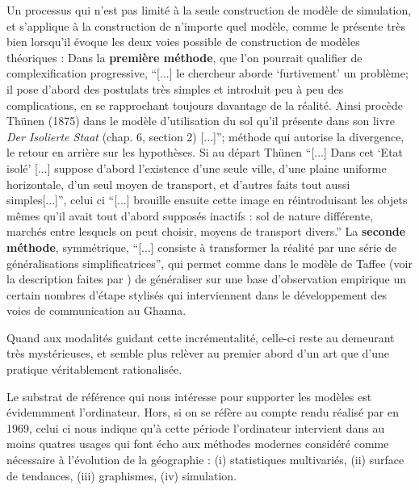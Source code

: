 Un processus qui n'est pas limité à la seule construction de modèle de simulation, et s'applique à la construction de n'importe quel modèle, comme le présente très bien \textcite[32-33]{Haggett1965} lorsqu'il évoque les deux voies possible de construction de modèles théoriques : Dans la \textbf{première méthode}, que l'on pourrait qualifier de complexification progressive, \enquote{[...] le chercheur aborde \enquote{furtivement} un problème; il pose d'abord des postulats très simples et introduit peu à peu des complications, en se rapprochant toujours davantage de la réalité. Ainsi procède Thünen (1875) dans le modèle d'utilisation du sol qu'il présente dans son livre \textit{Der Isolierte Staat} (chap. 6, section 2) [...]}; méthode qui autorise la divergence, le retour en arrière sur les hypothèses. Si au départ Thünen \enquote{[...] Dans cet \enquote{Etat isolé} [...] suppose d'abord l'existence d'une seule ville, d'une plaine uniforme horizontale, d'un seul moyen de transport, et d'autres faits tout aussi simples[...]}, celui ci \enquote{[...] brouille ensuite cette image en réintroduisant les objets mêmes qu'il avait tout d'abord supposés inactifs : sol de nature différente, marchés entre lesquels on peut choisir, moyens de transport divers.} La \textbf{seconde méthode}, symmétrique, \enquote{[...] consiste à transformer la réalité par une série de généralisations simplificatrices}, qui permet comme dans le modèle de Taffee (voir la description faites par \textcite[93-96]{Haggett1965}) de généraliser sur une base d'observation empirique un certain nombres d'étape stylisés qui interviennent dans le développement des voies de communication au Ghanna.

Quand aux modalités guidant cette incrémentalité, celle-ci reste au demeurant très mystérieuses, et semble plus relèver au premier abord d'un art \autocite{Tocher1963, Axelrod1997} que d'une pratique véritablement rationalisée.

Le substrat de référence qui nous intéresse pour supporter les modèles est évidemmment l'ordinateur. Hors, si on se réfère au compte rendu réalisé par \textcite{Haggett1969} en 1969, celui ci nous indique qu'à cette période l'ordinateur intervient dans au moins quatres usages qui font écho aux méthodes modernes considéré comme nécessaire \textcite{Claval1977} à l'évolution  de la géographie : (i) statistiques multivariés, (ii) surface de tendances, (iii) graphismes, (iv) simulation. 

